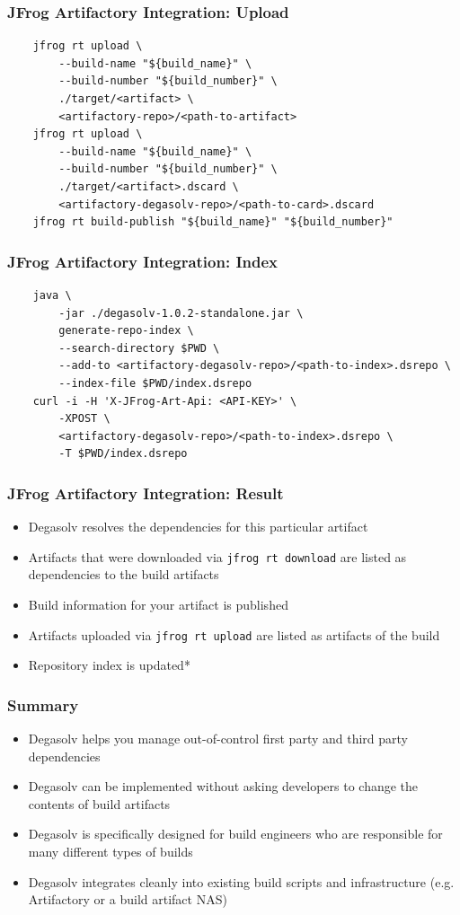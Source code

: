 \documentclass{beamer}
\begin{document}
\begin{frame}[fragile]
\frametitle{JFrog Artifactory Integration: Upload}
\begin{verbatim}
    jfrog rt upload \
        --build-name "${build_name}" \
        --build-number "${build_number}" \
        ./target/<artifact> \
        <artifactory-repo>/<path-to-artifact>
    jfrog rt upload \
        --build-name "${build_name}" \
        --build-number "${build_number}" \
        ./target/<artifact>.dscard \
        <artifactory-degasolv-repo>/<path-to-card>.dscard
    jfrog rt build-publish "${build_name}" "${build_number}"
\end{verbatim}
\end{frame}
\begin{frame}[fragile]
\frametitle{JFrog Artifactory Integration: Index}
\begin{verbatim}
    java \
        -jar ./degasolv-1.0.2-standalone.jar \
        generate-repo-index \
        --search-directory $PWD \
        --add-to <artifactory-degasolv-repo>/<path-to-index>.dsrepo \
        --index-file $PWD/index.dsrepo
    curl -i -H 'X-JFrog-Art-Api: <API-KEY>' \
        -XPOST \
        <artifactory-degasolv-repo>/<path-to-index>.dsrepo \
        -T $PWD/index.dsrepo
\end{verbatim}
\end{frame}
\begin{frame}
  \frametitle{JFrog Artifactory Integration: Result}
  \begin{itemize}
  \item Degasolv resolves the dependencies for this particular artifact
  \item Artifacts that were downloaded via \texttt{jfrog rt download} are
      listed as dependencies to the build artifacts
  \item Build information for your artifact is published
  \item Artifacts uploaded via \texttt{jfrog rt upload} are listed as artifacts
      of the build
  \item Repository index is updated*
  \end{itemize}
\end{frame}
\begin{frame}
  \frametitle{Summary}
  \begin{itemize}
  \item Degasolv helps you manage out-of-control first party and third party dependencies
  \item Degasolv can be implemented without asking developers to change the
      contents of build artifacts
  \item Degasolv is specifically designed for build engineers who are
      responsible for many different types of builds
  \item Degasolv integrates cleanly into existing build scripts and
      infrastructure (e.g. Artifactory or a build artifact NAS)
  \end{itemize}
  \end{frame}
\end{document}
